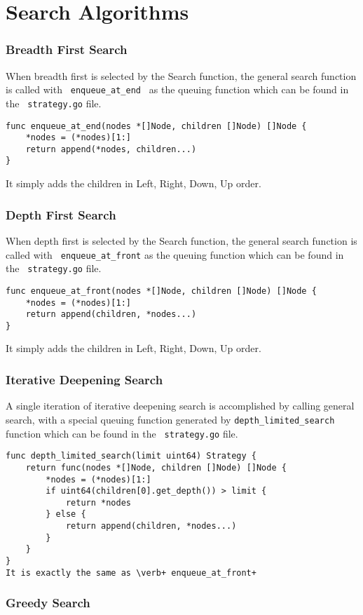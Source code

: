 \documentclass[14pt,a4paper]{report}
\begin{document}
\part{Search Algorithms}
\section{Breadth First Search}
When breadth first is selected by the Search function, the general search function is called
with \verb+ enqueue_at_end + as the queuing function which can be found in the \verb+ strategy.go+ file.
\begin{lstlisting}
func enqueue_at_end(nodes *[]Node, children []Node) []Node {
    *nodes = (*nodes)[1:]
    return append(*nodes, children...)
}
\end{lstlisting}
It simply adds the children in Left, Right, Down, Up order.
\section{Depth First Search}
When depth first is selected by the Search function, the general search function is called
with \verb+ enqueue_at_front+ as the queuing function which can be found in the \verb+ strategy.go+ file.
\begin{lstlisting}
func enqueue_at_front(nodes *[]Node, children []Node) []Node {
    *nodes = (*nodes)[1:]
    return append(children, *nodes...)
}
\end{lstlisting}
It simply adds the children in Left, Right, Down, Up order.
\section{Iterative Deepening Search}
A single iteration of iterative deepening search is accomplished by calling general search,
with a special queuing function generated by \verb+depth_limited_search+ function which can be 
found in the \verb+ strategy.go+ file.
\begin{lstlisting}
func depth_limited_search(limit uint64) Strategy {
    return func(nodes *[]Node, children []Node) []Node {
        *nodes = (*nodes)[1:]
        if uint64(children[0].get_depth()) > limit {
            return *nodes
        } else {
            return append(children, *nodes...)
        }
    }
}
It is exactly the same as \verb+ enqueue_at_front+
\end{lstlisting}
\section{Greedy Search}
\end{document}
